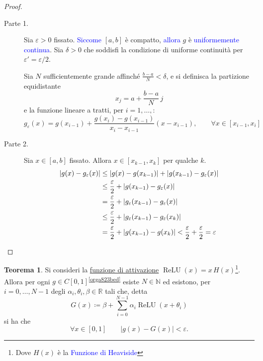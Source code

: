 \documentclass[10pt]{book}
\newcommand{\1}{\mathds{1}}
\newcommand{\R}{\mathds{R}}
\newcommand{\N}{\mathds{N}}
\theoremstyle{definition}%
\newtheorem{thm}{Teorema}[section]
\theoremstyle{plain}
\theoremstyle{remark}
\renewcommand{\href}[2]{\textcolor{blue}{#2}}
\begin{document}
\begin{proof}
\hphantom{Ciano}\par

\begin{description}
\item[{Parte 1.}] Sia \(\varepsilon>0\) fissato. \href{../../../../../org/roam/20250701121640-teorema_di_heine_borel.org}{Siccome} \([a,b]\) è compatto, \href{../../../../../org/roam/20250630155208-funzione_reale_continua_su_un_compatto_e_uniformemente_continua.org}{allora} \(g\) è \href{../../../../../org/roam/20250611135127-funzione_uniformemente_continua.org}{uniformemente continua}. Sia \(\delta>0\) che soddisfi la condizione di uniforme continuità per \(\varepsilon'=\varepsilon/2\).

Sia \(N\) sufficientemente grande affinché \(\frac{b-a}{N}<\delta\), e si definisca la partizione equidistante
\begin{equation*}
  x_{j} = a + \frac{b-a}{N}\, j
\end{equation*}
e la funzione lineare a tratti, per \(i=1,\dots,\):
\begin{equation*}
  g_{\varepsilon}(x) = g(x_{i-1}) +\frac{g(x_{i})-g(x_{i-1})}{x_{i}-x_{i-1}} (x-x_{i-1}),\qquad \forall x \in [x_{i-1},x_{i}]
\end{equation*}

\item[{Parte 2.}] Sia \(x \in [a,b]\) fissato. Allora \(x \in [x_{k-1},x_{k}]\) per qualche \(k\).
\begin{align*}
  |g(x)-g_{\varepsilon}(x)| &\le |g(x)-g(x_{k-1})| + |g(x_{k-1}) - g_{\varepsilon} (x)|\\
  &\le \frac{\varepsilon}{2} + |g(x_{k-1}) - g_{\varepsilon} (x)|\\
  &= \frac{\varepsilon}{2} + |g_{\varepsilon}(x_{k-1}) - g_{\varepsilon} (x)|\\
  &\le \frac{\varepsilon}{2}+ |g_{\varepsilon}(x_{k-1}) - g_{\varepsilon} (x_{k})|\\
  &= \frac{\varepsilon}{2}+ |g(x_{k-1}) - g (x_{k})| < \frac{\varepsilon}{2}+\frac{\varepsilon}{2} = \varepsilon\qedhere
\end{align*}
\end{description}
\end{proof}
\begin{thm}
Si consideri la \hyperref[sec:org08fce50]{funzione di attivazione} \(\operatorname{ReLU}(x) = x\,H(x)\)\footnote{Dove \(H(x)\) è la \href{../../../../../org/roam/20250624161413-funzione_di_heaviside.org}{Funzione di Heaviside}}. Allora per ogni \(g \in C[0,1]\)\textsuperscript{\ref{orga823bed}} esiste \(N \in \N\) ed esistono, per \(i=0,\dots,N-1\) degli \(\alpha_{i}, \theta_{i}, \beta \in \R\) tali che, detta
\begin{equation*}
G(x) \coloneqq \beta+\sum_{i=0}^{N-1} \alpha_{i}\operatorname{ReLU}(x+\theta_{i})
\end{equation*}
si ha che
\begin{equation*}
\forall x \in[0,1]\qquad |g(x)-G(x)|<\varepsilon.
\end{equation*}
\end{thm}
\end{document}

